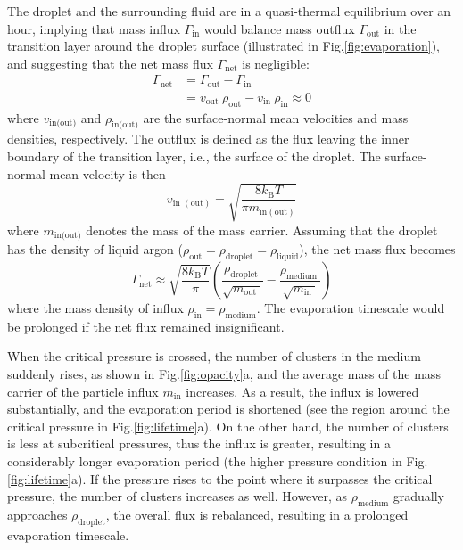 The droplet and the surrounding fluid are in a quasi-thermal equilibrium over an hour, implying that mass influx $\Gamma_\text{in}$ would balance mass outflux $\Gamma_\text{out}$ in the transition layer around the droplet surface (illustrated in Fig.\ref{fig:evaporation}), and suggesting that the net mass flux $\Gamma_\text{net}$ is negligible:
\begin{equation}
\begin{aligned}
\Gamma_{\text{net}} &= \Gamma_{\text{out}} - \Gamma_{\text{in}} \\
&= v_{\text{out }} \rho_{\text{out}} - v_{\text{in }} \rho_{\text{in}} \approx 0
\end{aligned}
\end{equation}
where $v_\text{in(out)}$  and $\rho_\text{in(out)}$ are the surface-normal mean velocities and mass densities, respectively. The outflux is defined as the flux leaving the inner boundary of the transition layer, i.e., the surface of the droplet. The surface-normal mean velocity is then
\begin{equation}
v_{\text {in }(\mathrm{out})}=\sqrt{\frac{8 k_{\mathrm{B}} T}{\pi m_{\mathrm{in}(\mathrm{out})}}}
\end{equation}
where $m_\text{in(out)}$ denotes the mass of the mass carrier. Assuming that the droplet has the density of liquid argon  ($\rho_\text{out} = \rho_\text{droplet} = \rho_\text{liquid}$), the net mass flux becomes
\begin{equation}
\Gamma_{\mathrm{net}} \approx \sqrt{\frac{8 k_{\mathrm{B}} T}{\pi}}\left(\frac{\rho_{\text {droplet }}}{\sqrt{m_{\text {out }}}}-\frac{\rho_{\text {medium }}}{\sqrt{m_{\text {in }}}}\right)
\end{equation}
where the mass density of influx $\rho_\text{in} = \rho_\text{medium}$. The evaporation timescale would be prolonged if the net flux remained insignificant.

When the critical pressure is crossed, the number of clusters in the medium suddenly rises, as shown in Fig.\ref{fig:opacity}a, and the average mass of the mass carrier of the particle influx $m_\text{in}$ increases. As a result, the influx is lowered substantially, and the evaporation period is shortened (see the region around the critical pressure in Fig.\ref{fig:lifetime}a). On the other hand, the number of clusters is less at subcritical pressures, thus the influx is greater, resulting in a considerably longer evaporation period (the higher pressure condition in Fig.\ref{fig:lifetime}a). If the pressure rises to the point where it surpasses the critical pressure, the number of clusters increases as well. However, as $\rho_\text{medium}$ gradually approaches $\rho_\text{droplet}$, the overall flux is rebalanced, resulting in a prolonged evaporation timescale.
